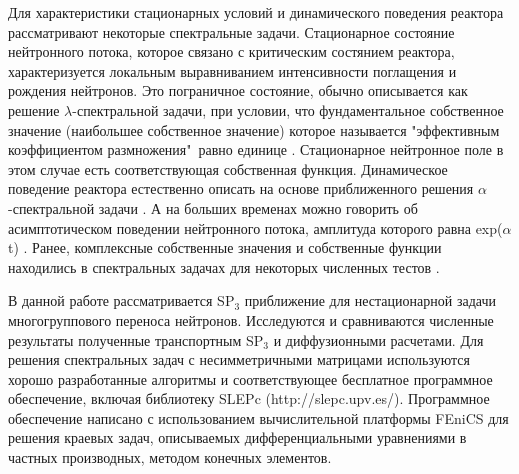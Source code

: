 \documentclass{crm-article}
\begin{document}
Для характеристики стационарных условий и динамического поведения реактора рассматривают некоторые спектральные задачи.
Стационарное состояние нейтронного потока, которое связано с критическим состянием реактора, характеризуется локальным выравниванием интенсивности поглащения и рождения нейтронов.
Это пограничное состояние, обычно описывается как решение $\lambda$-спектральной задачи, при условии, что фундаментальное собственное значение (наибольшее собственное значение) которое называется "эффективным коэффициентом размножения"\ равно единице \cite{bell1970}. 
Стационарное нейтронное поле в этом случае есть соответствующая собственная функция.
Динамическое поведение реактора естественно описать на основе приближенного решения $\alpha$-спектральной задачи \cite{verdu2010, carreno2017}.
А на больших временах можно говорить об асимптотическом поведении нейтронного потока, амплитуда которого равна exp($\alpha$t) \cite{avvakumov2017mm}.  
Ранее, комплексные собственные значения и собственные функции находились в спектральных задачах для некоторых численных тестов \cite{avvakumov2017, avvakumov2018}.

В данной работе рассматривается SP$_3$ приближение для нестационарной задачи многогруппового переноса нейтронов.
Исследуются и сравниваются численные результаты полученные транспортным SP$_3$ и диффузионными расчетами.
Для решения спектральных задач с несимметричными матрицами используются хорошо разработанные алгоритмы и соответствующее бесплатное программное обеспечение, включая библиотеку SLEPc (http://slepc.upv.es/).
Программное обеспечение написано с использованием вычислительной платформы FEniCS \cite{logg2012} для решения краевых задач, описываемых дифференциальными уравнениями в частных производных, методом конечных элементов.
\end{document}
